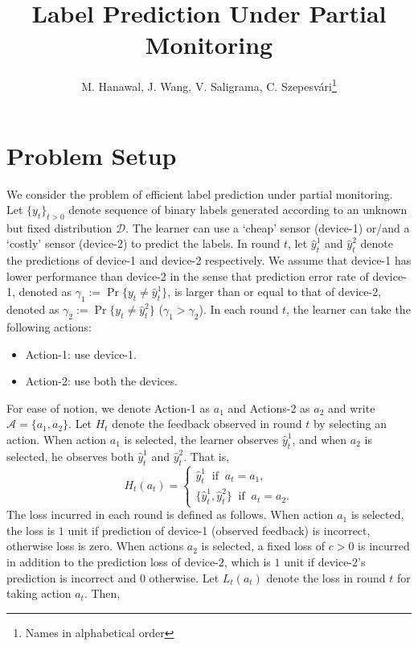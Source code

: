 \documentclass[draft, onecolumn, 12pt]{IEEEtran}
\begin{document}
\title{Label Prediction Under Partial Monitoring}
\author{M. Hanawal, J. Wang, V. Saligrama, C. Szepesv\'ari\footnote{Names in alphabetical order}\\}
\maketitle
\section{Problem Setup}
\label{sec:Setup}
We consider the problem of efficient label prediction under partial monitoring. Let $\{y_t\}_{{t>0}}$ denote sequence of binary labels generated according to an unknown but fixed distribution $\mathcal{D}$.  The learner can use a `cheap' sensor (device-1) or/and a `costly' sensor (device-2) to predict the labels. In round $t$, let $\hat{y}^1_t$ and $\hat{y}^2_t$ denote the predictions of device-1 and device-2 respectively. We assume that device-1 has lower performance than device-2 in the sense that prediction error rate of device-1, denoted as 
$\gamma_1:=\Pr\{y_t\neq \hat{y}^1_t\}$, is larger than or equal to that of device-2, denoted as $\gamma_2:=\Pr\{y_t\neq \hat{y}^2_t\}$ ($\gamma_1>\gamma_2$). In each round $t$, the learner can take the following actions: 
\begin{itemize}
	\item Action-1: use device-1.
 \item Action-2: use both the devices. 
\end{itemize}
For ease of notion, we denote Action-1 as $a_1$ and Actions-2 as $a_2$ and write $\mathcal{A}=\{a_1,a_2\}$. Let $H_t$ denote the feedback observed in round $t$ by selecting an action. When action $a_1$ is selected, the learner observes $\hat{y}^1_t$, and when $a_2$ is selected, he observes both $\hat{y}^1_t$ and $\hat{y}^2_t$. That is, 
\begin{equation}
H_t(a_t)=\begin{cases}
\hat{y}_t^1 \;\;\mbox{if}\;\;a_t=a_1,\\
\{\hat{y}^1_t, \hat{y}^2_t\} \;\;\mbox{if}\;\;a_t=a_2.
\end{cases}
\end{equation} 
The loss incurred in each round is defined as follows. When action $a_1$ is selected, the loss is $1$ unit if prediction of device-1 (observed feedback) is incorrect, otherwise loss is zero. When actions $a_2$ is selected, a fixed loss of $c>0$ is incurred in addition to the prediction loss of device-2, which is $1$ unit if device-2's prediction is incorrect and $0$ otherwise. Let $L_t(a_t)$ denote the loss in round $t$ for taking action $a_t$. Then,
\end{document}
